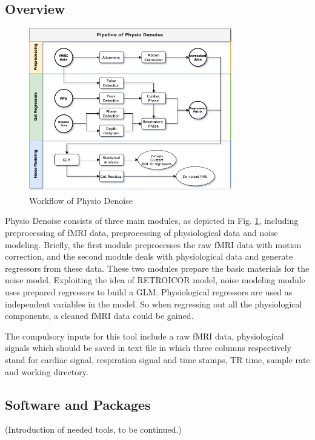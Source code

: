 \subsection{Overview}

\begin{figure}
    \centering
    \includegraphics[width=0.8\textwidth]{Figures/pipe.png}
    \caption{Workflow of Physio Denoise}
    \label{fig:modules}
\end{figure} 

Physio Denoise consists of three main modules, as depicted in Fig. \ref{fig:modules}, 
including preprocessing of fMRI data, preprocessing of physiological data  and noise modeling.
Briefly, the first module preprocesses the raw fMRI data with motion correction, 
and the second module deals with physiological data and generate regressors
from these data. 
These two modules prepare the basic materials for the noise model. 
Exploiting the idea of RETROICOR model, 
noise modeling module uses prepared regressors to build a GLM.
Physiological regressors are used as independent variables in the model. 
So when regressing out all the physiological components, a cleaned fMRI data could be gained. 

The compulsory inputs for this tool include a raw fMRI data, 
physiological signals which should be saved in text file in which three columns respectively stand for cardiac signal, 
respiration signal and time stamps,
TR time, sample rate and working directory.

\subsection{Software and Packages}

(Introduction of needed tools, to be continued.)

